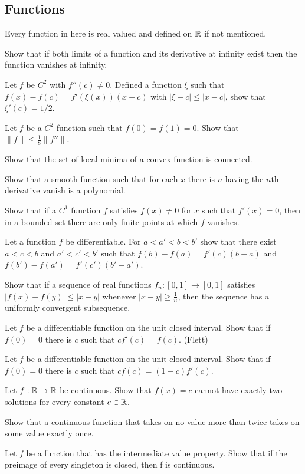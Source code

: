 \documentclass[11pt]{report}
\begin{document}
\subsection{Functions}
Every function in here is real valued and defined on $\mathbb{R}$ if not mentioned.
\begin{cond}
\item Show that if both limits of a function and its derivative at infinity exist then the function vanishes at infinity.
\item Let $f$ be $C^2$ with $f''(c)\ne0$. Defined a function $\xi$ such that $f(x)-f(c)=f'(\xi(x))(x-c)$ with $|\xi-c|\le|x-c|$, show that $\xi'(c)=1/2$.
\item Let $f$ be a $C^2$ function such that $f(0)=f(1)=0$. Show that $\|f\|\le\frac18\|f''\|$.
\item Show that the set of local minima of a convex function is connected.
\item Show that a smooth function such that for each $x$ there is $n$ having the $n$th derivative vanish is a polynomial.
\item Show that if a $C^1$ function $f$ satisfies $f(x)\ne0$ for $x$ such that $f'(x)=0$, then in a bounded set there are only finite points at which $f$ vanishes.
\item Let a function $f$ be differentiable. For $a<a'<b<b'$ show that there exist $a<c<b$ and $a'<c'<b'$ such that $f(b)-f(a)=f'(c)(b-a)$ and $f(b')-f(a')=f'(c')(b'-a')$.
\item Show that if a sequence of real functions $f_n\colon[0,1]\to[0,1]$ satisfies $|f(x)-f(y)|\le|x-y|$ whenever $|x-y|\ge\frac1n$, then the sequence has a uniformly convergent subsequence.
\item Let $f$ be a differentiable function on the unit closed interval. Show that if $f(0)=0$ there is $c$ such that $cf'(c)=f(c)$. (Flett)
\item Let $f$ be a differentiable function on the unit closed interval. Show that if $f(0)=0$ there is $c$ such that $cf(c)=(1-c)f'(c)$.
\item Let $f:\R\to\R$ be continuous. Show that $f(x)=c$ cannot have exactly two solutions for every constant $c\in\mathbb{R}$.
\item Show that a continuous function that takes on no value more than twice takes on some value exactly once.
\item Let $f$ be a function that has the intermediate value property. Show that if the preimage of every singleton is closed, then f is continuous.
\end{cond}
\end{document}
